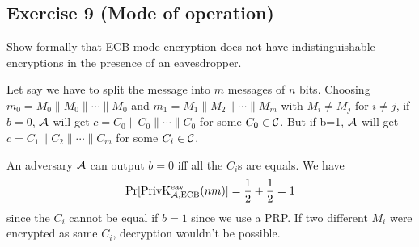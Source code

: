 \subsection{Exercise 9 (Mode of operation)}
Show formally that ECB-mode encryption does not have indistinguishable encryptions in the presence of an eavesdropper.
\begin{solution}
  Let say we have to split the message into $m$ messages of $n$ bits.
  Choosing $m_0 = M_0 \| M_0 \| \cdots \| M_0$ and $m_1 = M_1 \| M_2 \| \cdots \| M_m$ with $M_i \neq M_j$ for $i \neq j$,
  if $b = 0$, $\mathcal{A}$ will get $c = C_0 \| C_0 \| \cdots \| C_0$ for some $C_0 \in \mathcal{C}$. But if b=1, $\mathcal{A}$ will get $c = C_1 \| C_2 \| \cdots \| C_m$ for some $C_i \in \mathcal{C}$.

  An adversary $\mathcal{A}$ can output $b = 0$ iff all the $C_i$s are equals.
  We have
  $$ \Pr[\operatorname{PrivK}^{\text{eav}}_{\mathcal{A},\text{ECB}}(nm)] = \frac{1}{2} + \frac{1}{2} = 1 $$
  since the $C_i$ cannot be equal if $b = 1$ since we use a PRP.
  If two different $M_i$ were encrypted as same $C_i$, decryption wouldn't be possible.
\end{solution}